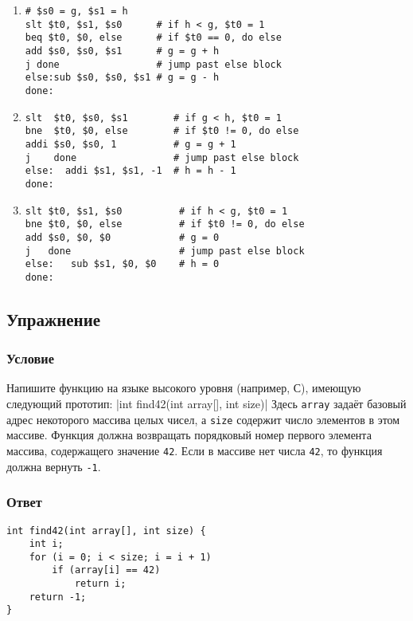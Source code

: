 \documentclass[12pt]{article}
\newenvironment{e}[1][dummy label]{
    \subsection{Упражнение}\label{#1}
    \subsubsection*{Условие}
    }{
    \subsubsection*{Ответ}
}
\begin{document}
    \begin{enumerate}
        \item
        \begin{verbatim}
# $s0 = g, $s1 = h
slt $t0, $s1, $s0      # if h < g, $t0 = 1
beq $t0, $0, else      # if $t0 == 0, do else
add $s0, $s0, $s1      # g = g + h
j done                 # jump past else block
else:sub $s0, $s0, $s1 # g = g - h
done:
        \end{verbatim}

        \item
        \begin{verbatim}
slt  $t0, $s0, $s1        # if g < h, $t0 = 1
bne  $t0, $0, else        # if $t0 != 0, do else
addi $s0, $s0, 1          # g = g + 1
j    done                 # jump past else block
else:  addi $s1, $s1, -1  # h = h - 1
done:
        \end{verbatim}

        \item
        \begin{verbatim}
slt $t0, $s1, $s0          # if h < g, $t0 = 1
bne $t0, $0, else          # if $t0 != 0, do else
add $s0, $0, $0            # g = 0
j   done                   # jump past else block
else:   sub $s1, $0, $0    # h = 0
done:
        \end{verbatim}
    \end{enumerate}

    \begin{e}[e:find42]
        Напишите функцию на языке высокого уровня (например, С), имеющую следующий прототип: |int find42(int array[], int size)| Здесь \texttt{array} задаёт базовый адрес некоторого массива целых чисел, а \texttt{size} содержит число элементов в этом массиве. Функция должна возвращать порядковый номер первого элемента массива, содержащего значение \texttt{42}. Если в массиве нет числа \texttt{42}, то функция должна вернуть \texttt{-1}.
    \end{e}

    \begin{verbatim}
int find42(int array[], int size) {
    int i;
    for (i = 0; i < size; i = i + 1)
        if (array[i] == 42)
            return i;
    return -1;
}
    \end{verbatim}

    \newpage
\end{document}
